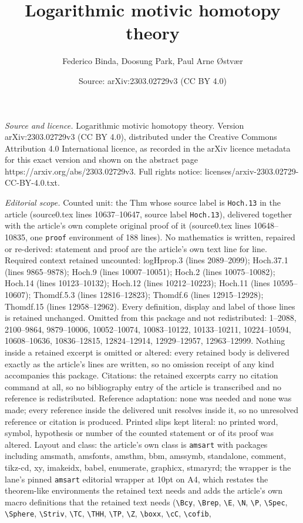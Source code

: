 \documentclass[10pt,a4paper]{amsart}
\title[Logarithmic motivic homotopy theory]{Logarithmic motivic homotopy theory}
\author{Federico Binda, Doosung Park, Paul Arne {\O}stv{\ae}r}
\date{Source: arXiv:2303.02729v3 (CC BY 4.0)}
\begin{document}
\maketitle

\noindent\emph{Source and licence.} Logarithmic motivic homotopy theory. Version arXiv:2303.02729v3 (CC BY 4.0), distributed under the Creative Commons Attribution 4.0 International licence, as recorded in the arXiv licence metadata for this exact version and shown on the abstract page https://arxiv.org/abs/2303.02729v3. Full rights notice: licenses/arxiv-2303.02729-CC-BY-4.0.txt.\par\smallskip

\noindent\textit{Editorial scope.} Counted unit: the Thm whose source label is \texttt{Hoch.13} in the article (source0.tex lines 10637--10647, source label \texttt{Hoch.13}), delivered together with the article's own complete original proof of it (source0.tex lines 10648--10835, one \texttt{proof} environment of 188 lines). No mathematics is written, repaired or re-derived: statement and proof are the article's own text line for line. Required context retained uncounted: logHprop.3 (lines 2089--2099); Hoch.37.1 (lines 9865--9878); Hoch.9 (lines 10007--10051); Hoch.2 (lines 10075--10082); Hoch.14 (lines 10123--10132); Hoch.12 (lines 10212--10223); Hoch.11 (lines 10595--10607); Thomdf.5.3 (lines 12816--12823); Thomdf.6 (lines 12915--12928); Thomdf.15 (lines 12958--12962). Every definition, display and label of those lines is retained unchanged. Omitted from this package and not redistributed: 1--2088, 2100--9864, 9879--10006, 10052--10074, 10083--10122, 10133--10211, 10224--10594, 10608--10636, 10836--12815, 12824--12914, 12929--12957, 12963--12999. Nothing inside a retained excerpt is omitted or altered: every retained body is delivered exactly as the article's lines are written, so no omission receipt of any kind accompanies this package. Citations: the retained excerpts carry no citation command at all, so no bibliography entry of the article is transcribed and no reference is redistributed. Reference adaptation: none was needed and none was made; every reference inside the delivered unit resolves inside it, so no unresolved reference or citation is produced. Printed slips kept literal: no printed word, symbol, hypothesis or number of the counted statement or of its proof was altered. Layout and class: the article's own class is \texttt{amsart} with packages including amsmath, amsfonts, amsthm, bbm, amssymb, standalone, comment, tikz-cd, xy, imakeidx, babel, enumerate, graphicx, stmaryrd; the wrapper is the lane's pinned \texttt{amsart} editorial wrapper at 10pt on A4, which restates the theorem-like environments the retained text needs and adds the article's own macro definitions that the retained text needs (\texttt{\textbackslash Bcy}, \texttt{\textbackslash Brep}, \texttt{\textbackslash E}, \texttt{\textbackslash N}, \texttt{\textbackslash P}, \texttt{\textbackslash Spec}, \texttt{\textbackslash Sphere}, \texttt{\textbackslash Striv}, \texttt{\textbackslash TC}, \texttt{\textbackslash THH}, \texttt{\textbackslash TP}, \texttt{\textbackslash Z}, \texttt{\textbackslash boxx}, \texttt{\textbackslash cC}, \texttt{\textbackslash cofib}, 
\end{document}
